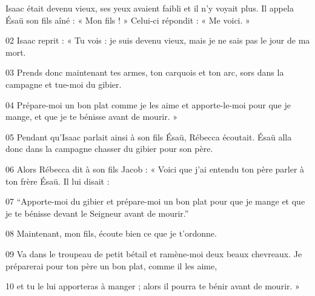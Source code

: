 Isaac était devenu vieux, ses yeux avaient faibli et il n’y voyait plus. Il appela Ésaü son fils aîné : « Mon fils ! » Celui-ci répondit : « Me voici. »

02 Isaac reprit : « Tu vois : je suis devenu vieux, mais je ne sais pas le jour de ma mort.

03 Prends donc maintenant tes armes, ton carquois et ton arc, sors dans la campagne et tue-moi du gibier.

04 Prépare-moi un bon plat comme je les aime et apporte-le-moi pour que je mange, et que je te bénisse avant de mourir. »

05 Pendant qu’Isaac parlait ainsi à son fils Ésaü, Rébecca écoutait. Ésaü alla donc dans la campagne chasser du gibier pour son père.

06 Alors Rébecca dit à son fils Jacob : « Voici que j’ai entendu ton père parler à ton frère Ésaü. Il lui disait :

07 “Apporte-moi du gibier et prépare-moi un bon plat pour que je mange et que je te bénisse devant le Seigneur avant de mourir.”

08 Maintenant, mon fils, écoute bien ce que je t’ordonne.

09 Va dans le troupeau de petit bétail et ramène-moi deux beaux chevreaux. Je préparerai pour ton père un bon plat, comme il les aime,

10 et tu le lui apporteras à manger ; alors il pourra te bénir avant de mourir. »